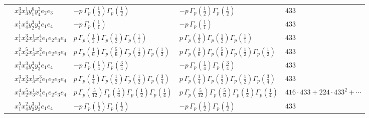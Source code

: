 \documentclass[11pt]{article}
\begin{document}
\begin{table}[ht]
{\begin{tabular}{@{}lllll@{}}
 & $x_{2}^{3} x_{3}^{1} y_{1}^{6} y_{4}^{2} e_{2} e_{3}$ & $- p \, \Gamma_p \left( \frac{1}{2} \right) \Gamma_p \left( \frac{1}{2} \right)$ & $- p \, \Gamma_p \left( \frac{1}{2} \right) \Gamma_p \left( \frac{1}{2} \right)$ & $433$ \\
 & $x_{1}^{1} x_{4}^{4} y_{2}^{3} y_{3}^{1} e_{1} e_{4}$ & $- p \, \Gamma_p \left( \frac{1}{1} \right)$ & $- p \, \Gamma_p \left( \frac{1}{1} \right)$ & $433$ \\
 & $x_{1}^{1} x_{2}^{3} x_{3}^{1} x_{4}^{4}  e_{1} e_{2} e_{3} e_{4}$ & $p \, \Gamma_p \left( \frac{1}{2} \right) \Gamma_p \left( \frac{1}{2} \right) \Gamma_p \left( \frac{1}{1} \right)$ & $p \, \Gamma_p \left( \frac{1}{2} \right) \Gamma_p \left( \frac{1}{2} \right) \Gamma_p \left( \frac{1}{1} \right)$ & $433$ \\
 & $x_{1}^{2} x_{2}^{5} x_{3}^{1} x_{4}^{2}  e_{1} e_{2} e_{3} e_{4}$ & $p \, \Gamma_p \left( \frac{1}{6} \right) \Gamma_p \left( \frac{5}{6} \right) \Gamma_p \left( \frac{1}{2} \right) \Gamma_p \left( \frac{1}{2} \right)$ & $p \, \Gamma_p \left( \frac{1}{6} \right) \Gamma_p \left( \frac{5}{6} \right) \Gamma_p \left( \frac{1}{2} \right) \Gamma_p \left( \frac{1}{2} \right)$ & $433$ \\
 & $x_{1}^{3} x_{4}^{3} y_{2}^{3} y_{3}^{1} e_{1} e_{4}$ & $- p \, \Gamma_p \left( \frac{1}{4} \right) \Gamma_p \left( \frac{3}{4} \right)$ & $- p \, \Gamma_p \left( \frac{1}{4} \right) \Gamma_p \left( \frac{3}{4} \right)$ & $433$ \\
 & $x_{1}^{3} x_{2}^{3} x_{3}^{1} x_{4}^{3}  e_{1} e_{2} e_{3} e_{4}$ & $p \, \Gamma_p \left( \frac{1}{4} \right) \Gamma_p \left( \frac{1}{2} \right) \Gamma_p \left( \frac{1}{2} \right) \Gamma_p \left( \frac{3}{4} \right)$ & $p \, \Gamma_p \left( \frac{1}{4} \right) \Gamma_p \left( \frac{1}{2} \right) \Gamma_p \left( \frac{1}{2} \right) \Gamma_p \left( \frac{3}{4} \right)$ & $433$ \\
 & $x_{1}^{4} x_{2}^{5} x_{3}^{1} x_{4}^{1}  e_{1} e_{2} e_{3} e_{4}$ & $p \, \Gamma_p \left( \frac{5}{12} \right) \Gamma_p \left( \frac{5}{6} \right) \Gamma_p \left( \frac{1}{2} \right) \Gamma_p \left( \frac{1}{4} \right)$ & $p \, \Gamma_p \left( \frac{5}{12} \right) \Gamma_p \left( \frac{5}{6} \right) \Gamma_p \left( \frac{1}{2} \right) \Gamma_p \left( \frac{1}{4} \right)$ & $416{\cdot}433{+}224{\cdot}433^{2}{+}\cdots$ \\
 & $x_{1}^{5} x_{4}^{2} y_{2}^{3} y_{3}^{1} e_{1} e_{4}$ & $- p \, \Gamma_p \left( \frac{1}{2} \right) \Gamma_p \left( \frac{1}{2} \right)$ & $- p \, \Gamma_p \left( \frac{1}{2} \right) \Gamma_p \left( \frac{1}{2} \right)$ & $433$ \\

\end{tabular}}
\end{table}
\end{document}
